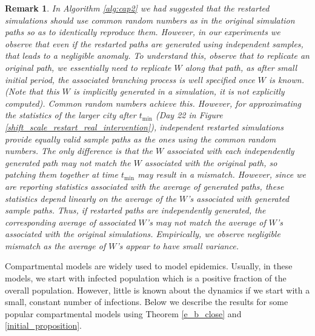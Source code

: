 \documentclass{article}
\newtheorem{remark}{Remark}
\theoremstyle{definition}
\begin{document}
 \begin{remark}
 \em{In Algorithm \ref{alg:cap2} we had suggested that the restarted simulations should use common random numbers as in the original simulation
 paths so as to identically reproduce them. However, in our experiments we observe that even if the restarted paths are generated using independent  samples, that leads to a negligible anomaly. 
 To understand this,  observe that to replicate an original path, we essentially need to replicate $W$ along that path, as after small initial period, the associated branching process is well specified once $W$ is known. (Note that this $W$ is implicitly generated in a simulation, it is not explicitly computed). Common random numbers achieve this. 
 However, for approximating the statistics of the larger city after $t_{\min}$ (Day 22 in Figure \ref{shift_scale_restart_real_intervention}), 
 independent restarted simulations provide equally valid sample paths as the ones using the common random numbers. 
 The only difference is that the $W$ associated with each independently generated path may not match the $W$ associated with the original path,
 so patching them together at time $t_{\min}$ may result in a mismatch.  However, since we are reporting statistics associated with the average of generated paths, these statistics depend linearly on the average of the $W$'s associated with generated sample paths. Thus, if restarted paths are independently generated, the corresponding average of associated $W$'s  may not match 
the average of $W$'s associated with the original simulations. Empirically, we observe negligible mismatch 
as the average of $W$'s appear to have small variance. }
 \end{remark}
 
 Compartmental models are widely used to model epidemics. Usually, in these models, we start with infected population which is a positive fraction of the overall population. However, little is known about the dynamics  if we start with a small, constant number of infections. 
 Below we describe the results for some popular compartmental models using Theorem \ref{e_b_close} and \ref{initial_proposition}.
\end{document}
